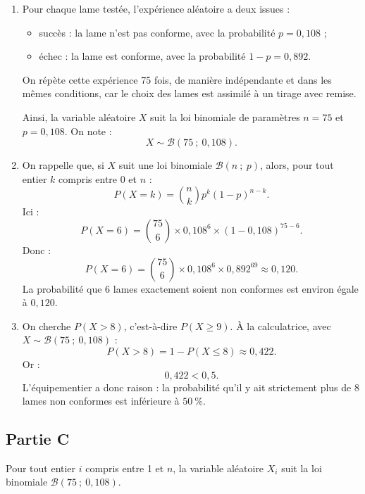\begin{enumerate}
	\item Pour chaque lame testée, l'expérience aléatoire a deux issues :
	\begin{itemize}[label={\textbullet~}]
		\item succès : la lame n'est pas conforme, avec la probabilité $p=0,108$ ;
		\item échec : la lame est conforme, avec la probabilité $1-p=0,892$.
	\end{itemize}
	On répète cette expérience 75 fois, de manière indépendante et dans les mêmes conditions, car le choix des lames est assimilé à un tirage avec remise.

	Ainsi, la variable aléatoire $X$ suit la loi binomiale de paramètres $n=75$ et $p=0,108$. On note :
	\[
	X\sim\mathcal{B}(75~;~0,108).
	\]

	\item On rappelle que, si $X$ suit une loi binomiale $\mathcal{B}(n~;~p)$, alors, pour tout entier $k$ compris entre 0 et $n$ :
	\[
	P(X=k)=\binom{n}{k}p^k(1-p)^{n-k}.
	\]
	Ici :
	\[
	P(X=6)=\binom{75}{6}\times 0,108^6\times (1-0,108)^{75-6}.
	\]
	Donc :
	\[
	P(X=6)=\binom{75}{6}\times 0,108^6\times 0,892^{69}\approx 0,120.
	\]
	La probabilité que 6 lames exactement soient non conformes est environ égale à $0,120$.

	\item On cherche $P(X>8)$, c'est-à-dire $P(X\geqslant 9)$.
	À la calculatrice, avec $X\sim\mathcal{B}(75~;~0,108)$ :
	\[
	P(X>8)=1-P(X\leqslant 8)\approx 0,422.
	\]
	Or :
	\[
	0,422<0,5.
	\]
	L'équipementier a donc raison : la probabilité qu'il y ait strictement plus de 8 lames non conformes est inférieure à $50~\%$.
\end{enumerate}

\subsection*{Partie C}

Pour tout entier $i$ compris entre 1 et $n$, la variable aléatoire $X_i$ suit la loi binomiale $\mathcal{B}(75~;~0,108)$.


